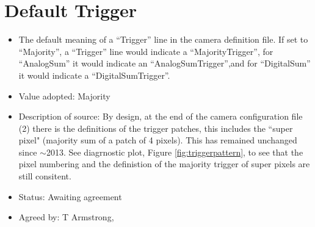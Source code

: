 \documentclass[GCT,short]{gct}
\begin{document}
\section{Default Trigger}
\begin{itemize}
\item The default meaning of a “Trigger” line in the camera definition file. If set to “Majority”, a “Trigger” line would indicate a “MajorityTrigger”, for “AnalogSum” it would indicate an “AnalogSumTrigger”,and for “DigitalSum” it would indicate a “DigitalSumTrigger”.
\item Value adopted: Majority
\item Description of source: By design, at the end of the camera configuration file (2) there is the definitions of the trigger patches, this includes the ``super pixel" (majority sum of a patch of 4 pixels). This has remained unchanged since $\sim$2013. See diagrnostic plot, Figure \ref{fig:triggerpattern}, to see that the pixel numbering and the definistion of the majority trigger of super pixels are still consitent.
\item Status: \color{orange} Awaiting agreement\color{black}
\item Agreed by: T Armstrong,
\end{itemize}
\end{document}
